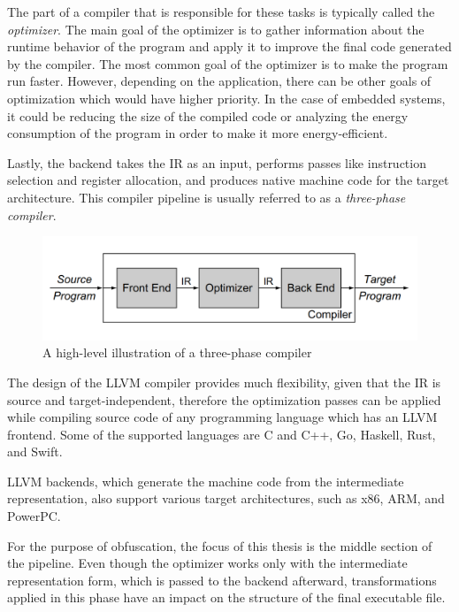 \documentclass[
  digital, %
  table,   %
  twoside, %
  nolof,     %
  nolot,     %
]{fithesis3}
\theoremstyle{definition}
\begin{document}
The part of a compiler that is responsible for these tasks is typically called the \textit{optimizer}. The main goal of the optimizer is to gather information about the runtime behavior of the program and apply it to improve the final code generated by the compiler. The most common goal of the optimizer is to make the program run faster. However, depending on the application, there can be other goals of optimization which would have higher priority. In the case of embedded systems, it could be reducing the size of the compiled code or analyzing the energy consumption of the program in order to make it more energy-efficient\cite{energy_consuption}. 

Lastly, the backend takes the IR as an input, performs passes like instruction selection and register allocation, and produces native machine code for the target architecture. This compiler pipeline is usually referred to as a \textit{three-phase compiler}.

\begin{figure}
    \centering
    \includegraphics[width=\textwidth]{3phase.png}
    \caption{A high-level illustration of a three-phase compiler \cite{eng_comp}}
    \label{fig:3phase}
\end{figure}
    
The design of the LLVM compiler provides much flexibility, given that the IR is source and target-independent, therefore the optimization passes can be applied while compiling source code of any programming language which has an LLVM frontend. Some of the supported languages are C and C++, Go, Haskell, Rust, and Swift. 

LLVM backends, which generate the machine code from the intermediate representation, also support various target architectures, such as x86, ARM, and PowerPC.

For the purpose of obfuscation, the focus of this thesis is the middle section of the pipeline. Even though the optimizer works only with the intermediate representation form, which is passed to the backend afterward, transformations applied in this phase have an impact on the structure of the final executable file. 
\end{document}
